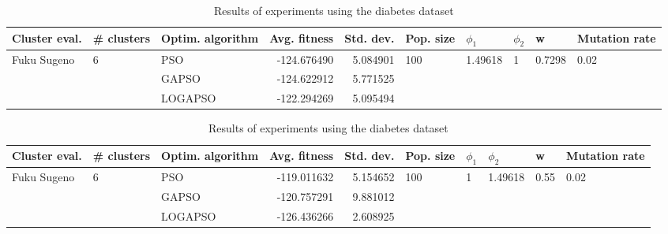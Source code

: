 \documentclass{article}
\begin{document}
\begin{table}
\centering
\caption{Results of experiments using the diabetes dataset}
\begin{tabular}{lllrrlllll}
\toprule
               Cluster eval. &        \# clusters & Optim. algorithm &  Avg. fitness &  Std. dev. &            Pop. size &               $\phi_{1}$ &         $\phi_{2}$ &                       w &         Mutation rate \\
\midrule
\multirow{3}{*}{Fuku Sugeno} & \multirow{3}{*}{6} &              PSO &   -124.676490 &   5.084901 & \multirow{3}{*}{100} & \multirow{3}{*}{1.49618} & \multirow{3}{*}{1} & \multirow{3}{*}{0.7298} & \multirow{3}{*}{0.02} \\
                             &                    &            GAPSO &   -124.622912 &   5.771525 &                      &                          &                    &                         &                       \\
                             &                    &          LOGAPSO &   -122.294269 &   5.095494 &                      &                          &                    &                         &                       \\
\bottomrule
\end{tabular}
\end{table}
\begin{table}
\centering
\caption{Results of experiments using the diabetes dataset}
\begin{tabular}{lllrrlllll}
\toprule
               Cluster eval. &        \# clusters & Optim. algorithm &  Avg. fitness &  Std. dev. &            Pop. size &         $\phi_{1}$ &               $\phi_{2}$ &                     w &         Mutation rate \\
\midrule
\multirow{3}{*}{Fuku Sugeno} & \multirow{3}{*}{6} &              PSO &   -119.011632 &   5.154652 & \multirow{3}{*}{100} & \multirow{3}{*}{1} & \multirow{3}{*}{1.49618} & \multirow{3}{*}{0.55} & \multirow{3}{*}{0.02} \\
                             &                    &            GAPSO &   -120.757291 &   9.881012 &                      &                    &                          &                       &                       \\
                             &                    &          LOGAPSO &   -126.436266 &   2.608925 &                      &                    &                          &                       &                       \\
\bottomrule
\end{tabular}
\end{table}
\end{document}

